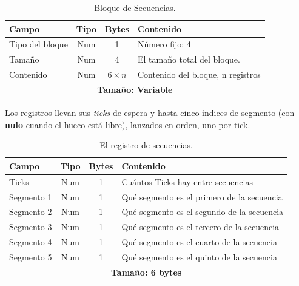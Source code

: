 \begin{table}[H]
	\centering
	\begin{tabular}{|l|c|c|p{8.4cm}|}
		\hline
		\textbf{Campo} & \textbf{Tipo} & \textbf{Bytes} & \textbf{Contenido} \\
		\hline
		
		Tipo del bloque & Num & 1 & Número fijo: 4\\ \hline
		
		Tamaño & Num & 4 & El tamaño total del bloque. \\ \hline
		
		Contenido & Num & $6 \times n$ & Contenido del bloque, n registros\\
		
		\hline\hline
		\multicolumn{4}{c}{\textbf{Tamaño: Variable}} \\ \hline
	\end{tabular}
	\caption{Bloque de Secuencias.}
	\label{tab:A02BlSecuencias}
\end{table}

Los registros llevan sus \textit{ticks} de espera y
hasta cinco índices de segmento (con \textbf{nulo} cuando el
hueco está libre), lanzados en orden, uno por tick.

\begin{table}[H]
	\centering
	\begin{tabular}{|l|c|c|p{8.4cm}|}
		\hline
		\textbf{Campo} & \textbf{Tipo} & \textbf{Bytes} & \textbf{Contenido} \\
		\hline
		
		Ticks & Num & 1 & Cuántos Ticks hay entre secuencias \\ \hline
		Segmento 1 & Num & 1 & Qué segmento es el primero de la secuencia \\ \hline
		Segmento 2 & Num & 1 & Qué segmento es el segundo de la secuencia \\ \hline
		Segmento 3 & Num & 1 & Qué segmento es el tercero de la secuencia \\ \hline
		Segmento 4 & Num & 1 & Qué segmento es el cuarto de la secuencia \\ \hline
		Segmento 5 & Num & 1 & Qué segmento es el quinto de la secuencia \\
		
		\hline\hline
		\multicolumn{4}{c}{\textbf{Tamaño: 6 bytes}} \\ \hline
	\end{tabular}
	\caption{El registro de secuencias.}
	\label{tab:A02RegSecuencias}
\end{table}

